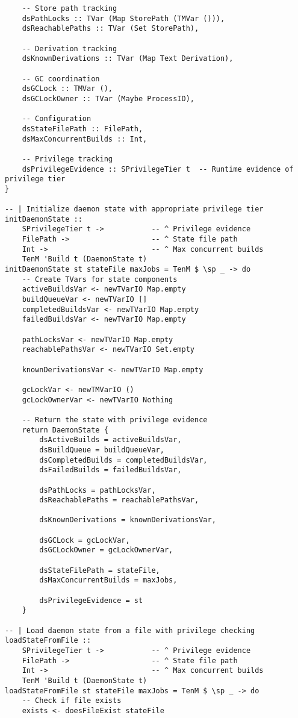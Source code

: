 \documentclass{article}
\begin{document}
\begin{tcolorbox}[title=Ten/Daemon/State.hs Changes]
\begin{verbatim}
    -- Store path tracking
    dsPathLocks :: TVar (Map StorePath (TMVar ())),
    dsReachablePaths :: TVar (Set StorePath),

    -- Derivation tracking
    dsKnownDerivations :: TVar (Map Text Derivation),

    -- GC coordination
    dsGCLock :: TMVar (),
    dsGCLockOwner :: TVar (Maybe ProcessID),

    -- Configuration
    dsStateFilePath :: FilePath,
    dsMaxConcurrentBuilds :: Int,

    -- Privilege tracking
    dsPrivilegeEvidence :: SPrivilegeTier t  -- Runtime evidence of privilege tier
}

-- | Initialize daemon state with appropriate privilege tier
initDaemonState ::
    SPrivilegeTier t ->           -- ^ Privilege evidence
    FilePath ->                   -- ^ State file path
    Int ->                        -- ^ Max concurrent builds
    TenM 'Build t (DaemonState t)
initDaemonState st stateFile maxJobs = TenM $ \sp _ -> do
    -- Create TVars for state components
    activeBuildsVar <- newTVarIO Map.empty
    buildQueueVar <- newTVarIO []
    completedBuildsVar <- newTVarIO Map.empty
    failedBuildsVar <- newTVarIO Map.empty

    pathLocksVar <- newTVarIO Map.empty
    reachablePathsVar <- newTVarIO Set.empty

    knownDerivationsVar <- newTVarIO Map.empty

    gcLockVar <- newTMVarIO ()
    gcLockOwnerVar <- newTVarIO Nothing

    -- Return the state with privilege evidence
    return DaemonState {
        dsActiveBuilds = activeBuildsVar,
        dsBuildQueue = buildQueueVar,
        dsCompletedBuilds = completedBuildsVar,
        dsFailedBuilds = failedBuildsVar,

        dsPathLocks = pathLocksVar,
        dsReachablePaths = reachablePathsVar,

        dsKnownDerivations = knownDerivationsVar,

        dsGCLock = gcLockVar,
        dsGCLockOwner = gcLockOwnerVar,

        dsStateFilePath = stateFile,
        dsMaxConcurrentBuilds = maxJobs,

        dsPrivilegeEvidence = st
    }

-- | Load daemon state from a file with privilege checking
loadStateFromFile ::
    SPrivilegeTier t ->           -- ^ Privilege evidence
    FilePath ->                   -- ^ State file path
    Int ->                        -- ^ Max concurrent builds
    TenM 'Build t (DaemonState t)
loadStateFromFile st stateFile maxJobs = TenM $ \sp _ -> do
    -- Check if file exists
    exists <- doesFileExist stateFile


\end{verbatim}
\end{tcolorbox}
\end{document}

